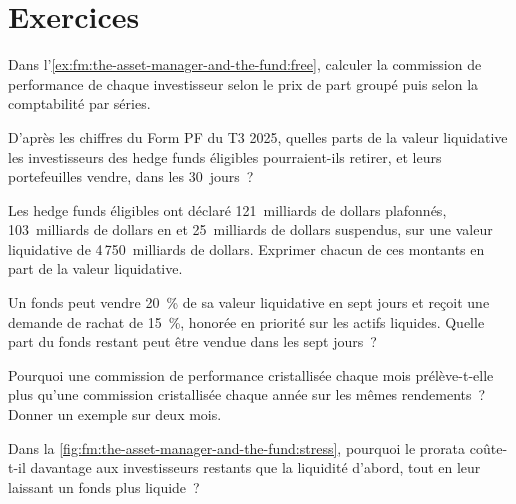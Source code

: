 \section{Exercices}

\begin{exercise}[$\star$]\label{exo:fm:the-asset-manager-and-the-fund:1}
Dans l'\cref{ex:fm:the-asset-manager-and-the-fund:free}, calculer la commission de performance de chaque investisseur selon le prix de part groupé puis selon la
comptabilité par séries.
\end{exercise}

\begin{exercise}[$\star$]\label{exo:fm:the-asset-manager-and-the-fund:2}
D'après les chiffres du Form PF du T3 2025, quelles parts de la valeur liquidative les investisseurs des hedge funds éligibles pourraient-ils retirer, et leurs portefeuilles vendre, dans les 30~jours~?
\end{exercise}

\begin{exercise}[$\star$]\label{exo:fm:the-asset-manager-and-the-fund:3}
Les hedge funds éligibles ont déclaré 121~milliards de dollars plafonnés, 103~milliards de dollars en  et 25~milliards de dollars suspendus, sur une valeur liquidative de 4\,750~milliards de dollars. Exprimer chacun
de ces montants en part de la valeur liquidative.
\end{exercise}

\begin{exercise}[$\star\star$]\label{exo:fm:the-asset-manager-and-the-fund:4}
Un fonds peut vendre 20~\% de sa valeur liquidative en sept jours et reçoit une demande de rachat de 15~\%, honorée en priorité sur les actifs liquides. Quelle part du fonds restant peut être vendue
dans les sept jours~?
\end{exercise}

\begin{exercise}[$\star\star$]\label{exo:fm:the-asset-manager-and-the-fund:5}
Pourquoi une commission de performance cristallisée chaque mois prélève-t-elle plus qu'une commission cristallisée chaque année sur les mêmes rendements~? Donner un exemple sur deux mois.
\end{exercise}

\begin{exercise}[$\star\star$]\label{exo:fm:the-asset-manager-and-the-fund:6}
Dans la \cref{fig:fm:the-asset-manager-and-the-fund:stress}, pourquoi le prorata coûte-t-il davantage aux investisseurs restants que la liquidité d'abord, tout en leur laissant un
fonds plus liquide~?
\end{exercise}

